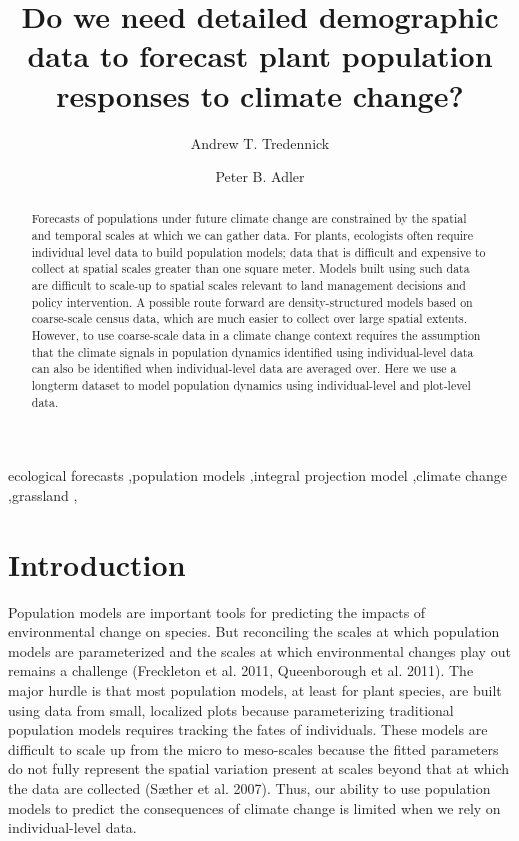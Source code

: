 \documentclass[author-year, 12pt,review]{components/elsarticle} %
\begin{document}
\begin{frontmatter}

  \title{Do we need detailed demographic data to forecast plant population
responses to climate change?}
    \author[usu]{Andrew T. Tredennick}
    \author[usu]{Peter B. Adler}
  
  
      \address[usu]{Department of Wildland Resources and the Ecology Center, Utah State
University, Logan, UT 84322, USA}    
  
  \begin{abstract}
  Forecasts of populations under future climate change are constrained by
  the spatial and temporal scales at which we can gather data. For plants,
  ecologists often require individual level data to build population
  models; data that is difficult and expensive to collect at spatial
  scales greater than one square meter. Models built using such data are
  difficult to scale-up to spatial scales relevant to land management
  decisions and policy intervention. A possible route forward are
  density-structured models based on coarse-scale census data, which are
  much easier to collect over large spatial extents. However, to use
  coarse-scale data in a climate change context requires the assumption
  that the climate signals in population dynamics identified using
  individual-level data can also be identified when individual-level data
  are averaged over. Here we use a longterm dataset to model population
  dynamics using individual-level and plot-level data.
  \end{abstract}
   \begin{keyword} ecological forecasts \sep population models \sep integral projection model \sep climate change \sep grassland \sep \end{keyword}
 \end{frontmatter}


\section{Introduction}\label{introduction}

Population models are important tools for predicting the impacts of
environmental change on species. But reconciling the scales at which
population models are parameterized and the scales at which
environmental changes play out remains a challenge (Freckleton et al.
2011, Queenborough et al. 2011). The major hurdle is that most
population models, at least for plant species, are built using data from
small, localized plots because parameterizing traditional population
models requires tracking the fates of individuals. These models are
difficult to scale up from the micro to meso-scales because the fitted
parameters do not fully represent the spatial variation present at
scales beyond that at which the data are collected (Sæther et al. 2007).
Thus, our ability to use population models to predict the consequences
of climate change is limited when we rely on individual-level data.
\end{document}
